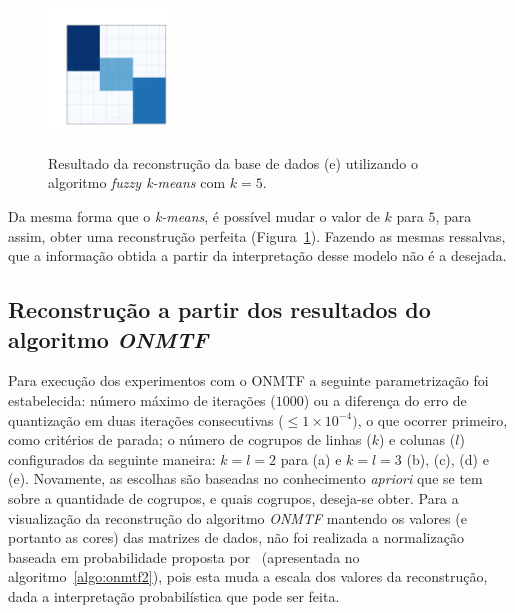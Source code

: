 \documentclass[
    12pt,                %
    oneside,            %
    a4paper,            %
    english,            %
    brazil                %
    ]{abntex2ppgsi}
\begin{document}


\begin{figure}[H]
\centering
    \caption{Resultado da reconstrução da base de dados (e) utilizando o algoritmo \textit{fuzzy k-means} com $k = 5$.}
    \includegraphics[width=0.3\textwidth]{img/e-reconstruction-2-fkmeans.png}
    \label{fig:reconstruction-2:fkmeans}
\end{figure}

Da mesma forma que o \textit{k-means}, é possível mudar o valor de $k$ para $5$, para assim, obter uma reconstrução perfeita (Figura~\ref{fig:reconstruction-2:fkmeans}).
Fazendo as mesmas ressalvas, que a informação obtida a partir da interpretação desse modelo não é a desejada.

\subsection{Reconstrução a partir dos resultados do algoritmo \textit{ONMTF}}
\label{subsec:results-reconstruction-onmtf}

Para execução dos experimentos com o ONMTF a seguinte parametrização foi estabelecida: número máximo de iterações ($1000$) ou a diferença do erro de quantização em duas iterações consecutivas ($\leq 1 \times 10^{-4})$, o que ocorrer primeiro, como critérios de parada; o número de cogrupos de linhas ($k$) e colunas ($l$) configurados da seguinte maneira: $k = l = 2$ para (a) e $k = l = 3$ (b), (c), (d) e (e).
Novamente, as escolhas são baseadas no conhecimento \textit{apriori} que se tem sobre a quantidade de cogrupos, e quais cogrupos, deseja-se obter.
Para a visualização da reconstrução do algoritmo \textit{ONMTF} mantendo os valores (e portanto as cores) das matrizes de dados, não foi realizada a normalização baseada em probabilidade proposta por~ (apresentada no algoritmo~\ref{algo:onmtf2}), pois esta muda a escala dos valores da reconstrução, dada a interpretação probabilística que pode ser feita.
\end{document}
